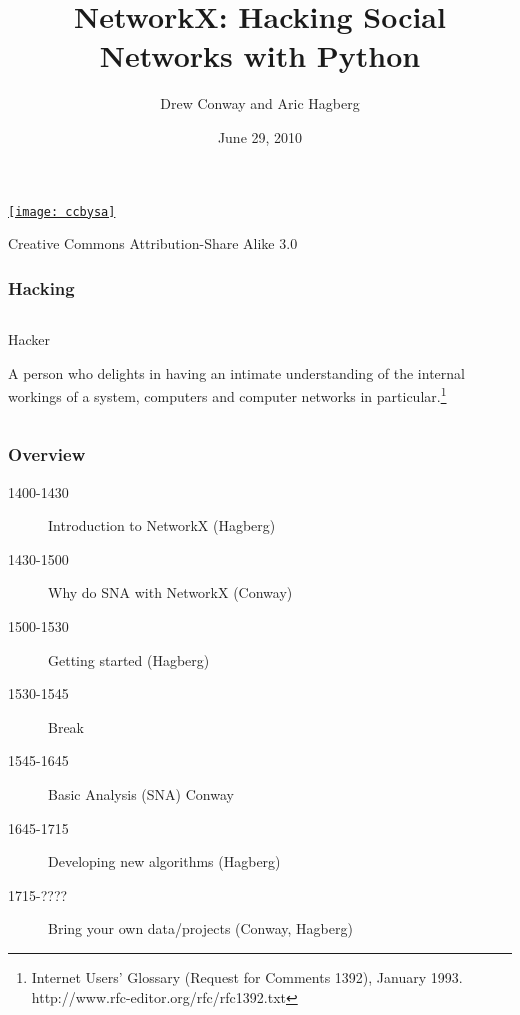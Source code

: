 \documentclass[xcolor=dvipsnames, 9pt]{beamer}
\title{NetworkX: Hacking Social Networks with Python}
\author{Drew Conway and Aric Hagberg}
\date{June 29, 2010}
\begin{document}
\begin{frame}[plain]
\titlepage

\tiny
\href{http://creativecommons.org/licenses/by-sa/3.0/us/}{\texttt{[image: ccbysa]}}

Creative Commons Attribution-Share Alike 3.0 
\end{frame}

\begin{frame}
\frametitle{Hacking}

\begin{columns}
\begin{column}{0.7\columnwidth}
\LARGE
Hacker

      A person who delights in having an intimate understanding of the
      internal workings of a system, computers and computer networks in
      particular.\footnote{
Internet Users' Glossary (Request for Comments 1392), January 1993.
http://www.rfc-editor.org/rfc/rfc1392.txt}
  
\end{column}
\end{columns}


\end{frame}

\begin{frame}
\frametitle{Overview}

\begin{description}

\item[1400-1430] Introduction to NetworkX (Hagberg)

\item[1430-1500]  Why do SNA with NetworkX (Conway)

\item[1500-1530] Getting started (Hagberg)

\item[1530-1545] Break

\item[1545-1645]  Basic Analysis (SNA) Conway

\item[1645-1715] Developing new algorithms (Hagberg)

\item[1715-????] Bring your own data/projects (Conway, Hagberg)

\end{description}

\end{frame}
\end{document}
